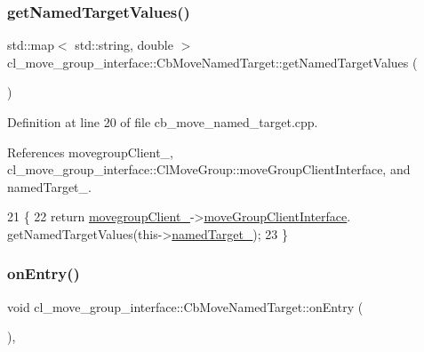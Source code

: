 \subsubsection{\texorpdfstring{get\+Named\+Target\+Values()}{getNamedTargetValues()}}
{\footnotesize\ttfamily std\+::map$<$ std\+::string, double $>$ cl\+\_\+move\+\_\+group\+\_\+interface\+::\+Cb\+Move\+Named\+Target\+::get\+Named\+Target\+Values (\begin{DoxyParamCaption}{ }\end{DoxyParamCaption})}



Definition at line 20 of file cb\+\_\+move\+\_\+named\+\_\+target.\+cpp.



References movegroup\+Client\+\_\+, cl\+\_\+move\+\_\+group\+\_\+interface\+::\+Cl\+Move\+Group\+::move\+Group\+Client\+Interface, and named\+Target\+\_\+.


\begin{DoxyCode}
21 \{
22     \textcolor{keywordflow}{return} \hyperlink{classcl__move__group__interface_1_1CbMoveNamedTarget_ab19a253b419bdbf3ec4b4b45a4198a65}{movegroupClient\_}->\hyperlink{classcl__move__group__interface_1_1ClMoveGroup_a92922ea689e4e1b7b91512c56629c95b}{moveGroupClientInterface}.
      getNamedTargetValues(this->\hyperlink{classcl__move__group__interface_1_1CbMoveNamedTarget_a597a5afdcba0359aaa8d3f923fdfe133}{namedTarget\_});
23 \}
\end{DoxyCode}
\mbox{\label{classcl__move__group__interface_1_1CbMoveNamedTarget_ab212edda280e896977d7ac567e4c1b29}} 
\subsubsection{\texorpdfstring{on\+Entry()}{onEntry()}}
{\footnotesize\ttfamily void cl\+\_\+move\+\_\+group\+\_\+interface\+::\+Cb\+Move\+Named\+Target\+::on\+Entry (\begin{DoxyParamCaption}{ }\end{DoxyParamCaption})\hspace{0.3cm}{\ttfamily [override]}, {\ttfamily [virtual]}}



